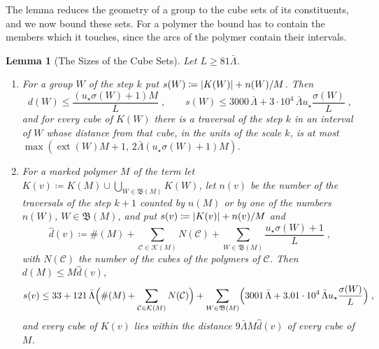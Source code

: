 \documentclass[11pt]{preprint}
\DeclarePairedDelimiter{\abs}{\lvert}{\rvert}
\numberwithin{equation}{section}
\newtheorem{lemma}[theorem]{Lemma}
\theoremstyle{definition}
\theoremstyle{remark}
\theoremstyle{plain}
\begin{document}
The lemma reduces the geometry of a group to the cube sets of its constituents, and we now bound these sets. For a polymer the bound has to contain the members which it touches, since the arcs of the polymer contain their intervals.

\begin{lemma}[The Sizes of the Cube Sets]\label{lem:cube-set-sizes}
Let $L \geq 81\bar\Lambda$.
\begin{enumerate}[label=(\roman*)]
\item For a group $W$ of the step $k$ put $s(W) \coloneqq \abs{K(W)} + n(W)/M$. Then
\begin{equation}\label{eq:member-cube-set}
    d(W) \leq \frac{(u_\star\sigma(W) + 1)M}{L}\;,
    \qquad
    s(W) \leq 3000\,\bar\Lambda + 3 \cdot 10^4\,\bar\Lambda u_\star\frac{\sigma(W)}{L}\;,
\end{equation}
and for every cube of $K(W)$ there is a traversal of the step $k$ in an interval of $W$ whose distance from that cube, in the units of the scale $k$, is at most $\max(\operatorname{ext}(W)M + 1,\, 2\bar\Lambda(u_\star\sigma(W) + 1)M)$.
\item For a marked polymer $M$ of the term let $K(v) \coloneqq K(M) \cup \bigcup_{W \in \mathfrak B(M)}K(W)$, let $n(v)$ be the number of the traversals of the step $k + 1$ counted by $n(M)$ or by one of the numbers $n(W)$, $W \in \mathfrak B(M)$, and put $s(v) \coloneqq \abs{K(v)} + n(v)/M$ and
\begin{equation}\label{eq:polymer-reach}
    \hat d(v) \coloneqq \#(M) + \sum_{\mathcal C \in \mathcal K(M)}N(\mathcal C) + \sum_{W \in \mathfrak B(M)}\frac{u_\star\sigma(W) + 1}{L}\;,
\end{equation}
with $N(\mathcal C)$ the number of the cubes of the polymers of $\mathcal C$. Then $d(M) \leq M\hat d(v)$,
\begin{equation}\label{eq:polymer-cube-set}
    s(v) \leq 33 + 121\,\bar\Lambda\Bigl(\#(M) + \sum_{\mathcal C \in \mathcal K(M)}N(\mathcal C)\Bigr) + \sum_{W \in \mathfrak B(M)}\Bigl(3001\,\bar\Lambda + 3.01 \cdot 10^4\,\bar\Lambda u_\star\frac{\sigma(W)}{L}\Bigr)\;,
\end{equation}
and every cube of $K(v)$ lies within the distance $9\bar\Lambda M\hat d(v)$ of every cube of $M$.
\end{enumerate}
\end{lemma}
\end{document}
